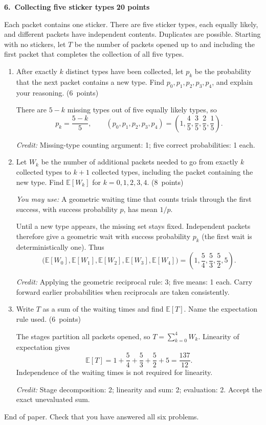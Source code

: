 \documentclass[11pt,letterpaper]{article}
\newcommand{\E}{\mathbb E}
\newcommand{\partpts}[1]{\unskip\nobreak\hspace{.3em}%
  \mbox{\small\color{muted}(#1 points)}}
\newcommand{\credit}[1]{\par{\footnotesize\color{muted}\textit{Credit:} #1}}
\newcommand{\problem}[3]{\par\addvspace{9pt}%
  {\large\bfseries\color{indigo}#1.\ #2}\hfill
  {\small\color{muted}\textbf{#3 points}}\par\nobreak}
\begin{document}
\newpage
\problem{6}{Collecting five sticker types}{20}
Each packet contains one sticker. There are five sticker types, each equally
likely, and different packets have independent contents. Duplicates are
possible. Starting with no stickers, let $T$ be the number of packets opened
up to and including the first packet that completes the collection of all
five types.
\begin{enumerate}
\item After exactly $k$ distinct types have been collected, let $p_k$ be
the probability that the next packet contains a new type. Find
$p_0,p_1,p_2,p_3,p_4$, and explain your reasoning. \partpts{6}
\begin{solution}[1.3in]
There are $5-k$ missing types out of five equally likely types, so
\[
p_k=\frac{5-k}{5},\qquad
(p_0,p_1,p_2,p_3,p_4)=\left(1,\frac45,\frac35,\frac25,\frac15\right).
\]
\credit{Missing-type counting argument: 1; five correct probabilities: 1 each.}
\end{solution}
\item Let $W_k$ be the number of additional packets needed to go from
exactly $k$ collected types to $k+1$ collected types, including the packet
containing the new type. Find $\E[W_k]$ for $k=0,1,2,3,4$. \partpts{8}

\textit{You may use:} A geometric waiting time that counts trials through
the first success, with success probability $p$, has mean $1/p$.
\begin{solution}[1.6in]
Until a new type appears, the missing set stays fixed. Independent packets
therefore give a geometric wait with success probability $p_k$ (the first
wait is deterministically one). Thus
\[
\bigl(\E[W_0],\E[W_1],\E[W_2],\E[W_3],\E[W_4]\bigr)
=\left(1,\frac54,\frac53,\frac52,5\right).
\]
\credit{Applying the geometric reciprocal rule: 3; five means: 1 each.
Carry forward earlier probabilities when reciprocals are taken consistently.}
\end{solution}
\item Write $T$ as a sum of the waiting times and find $\E[T]$.
Name the expectation rule used. \partpts{6}
\begin{solution}[1.8in]
The stages partition all packets opened, so $T=\sum_{k=0}^4W_k$.
Linearity of expectation gives
\[
\E[T]=1+\frac54+\frac53+\frac52+5=\frac{137}{12}.
\]
Independence of the waiting times is not required for linearity.
\credit{Stage decomposition: 2; linearity and sum: 2; evaluation: 2.
Accept the exact unevaluated sum.}
\end{solution}
\end{enumerate}
\vfill
\begin{center}\small\color{muted}End of paper. Check that you have answered all six problems.\end{center}
\label{exam-last-page}
\end{document}

